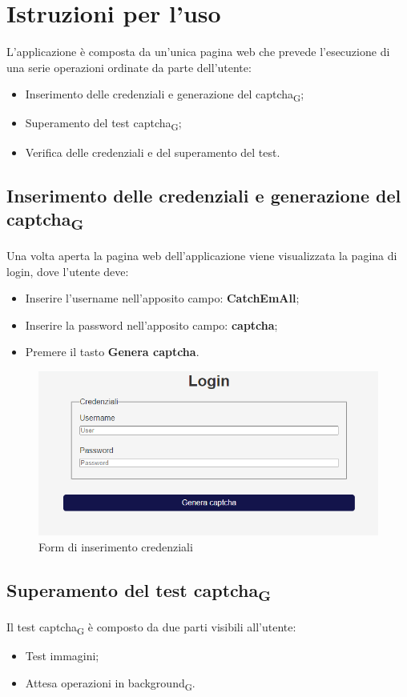 \section{Istruzioni per l'uso}
L'applicazione è composta da un'unica pagina web che prevede l'esecuzione di una serie operazioni ordinate da parte dell'utente:
\begin{itemize}
	\item Inserimento delle credenziali e generazione del captcha\textsubscript{G};
	\item Superamento del test captcha\textsubscript{G};
    \item Verifica delle credenziali e del superamento del test.
\end{itemize}    

\subsection{Inserimento delle credenziali e generazione del captcha\textsubscript{G}}
Una volta aperta la pagina web dell'applicazione viene visualizzata la pagina di login, dove l'utente deve:
\begin{itemize}
	\item Inserire l'username nell'apposito campo: \textbf{CatchEmAll};
	\item Inserire la password nell'apposito campo: \textbf{captcha};
    \item Premere il tasto \textbf{Genera captcha}.
\end{itemize}    

\begin{figure}[H]
    \centering
    \includegraphics[scale=0.8]{img/login.png}
    \caption{Form di inserimento credenziali}
\end{figure}

\subsection{Superamento del test captcha\textsubscript{G}}
Il test captcha\textsubscript{G} è composto da due parti visibili all'utente:
\begin{itemize}
	\item Test immagini;
	\item Attesa operazioni in background\textsubscript{G}.
\end{itemize} 

